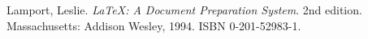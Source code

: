 



% 

%
\begin{thebibliography}{99}
   {\sc Lamport,} Leslie.
   \emph{\LaTeX: A Document Preparation System}.
   2nd edition.
   Massachusetts: Addison Wesley, 1994.
   ISBN 0-201-52983-1.

\end{thebibliography}
